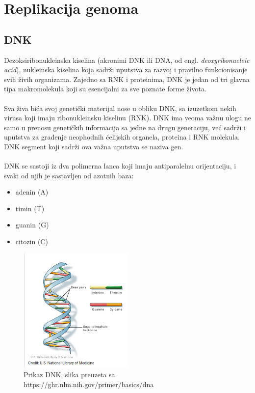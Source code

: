 \newpage

\section{Replikacija genoma}
\label{sec:replikacija}

\subsection{DNK}

Dezoksiribonukleinska kiselina (akronimi DNK ili DNA, od engl. \textit{ deoxyribonucleic acid}), nukleinska kiselina koja sadrži uputstva za razvoj i pravilno funkcionisanje svih živih organizama. Zajedno sa RNK i proteinima, DNK je jedan od tri glavna tipa makromolekula koji su esencijalni za sve poznate forme života. \\\\
Sva živa bića svoj genetički materijal nose u obliku DNK, sa izuzetkom nekih virusa koji imaju ribonukleinsku kiselinu (RNK). DNK ima veoma važnu ulogu ne samo u prenosu genetičkih informacija sa jedne na drugu generaciju, već sadrži i uputstva za građenje neophodnih ćelijskih organela, proteina i RNK molekula. DNK segment koji sadrži ova važna uputstva se naziva gen.\\\\

DNK se sastoji iz dva polimerna lanca koji imaju antiparalelnu orijentaciju, i svaki od njih je sastavljen od azotnih baza:
\begin{itemize}
	\item adenin (A)
	\item timin (T)
	\item guanin (G)
	\item citozin (C)
\end{itemize}

\begin{figure}[h]
\caption{Prikaz DNK, slika preuzeta sa https://ghr.nlm.nih.gov/primer/basics/dna}
\centering
\includegraphics[width=0.5\textwidth]{poglavlja/1/slike/DNK.png}
\end{figure} 

